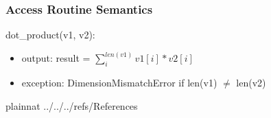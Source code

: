 \documentclass[12pt, titlepage]{article}
\begin{document}
\subsubsection{Access Routine Semantics}

\noindent dot\_product(v1, v2):
\begin{itemize}
\item output: result = $\sum_i^{len(v1)} v1[i] * v2[i]$
\item exception: DimensionMismatchError if len(v1) $\neq$ len(v2)
\end{itemize}


\newpage

 {plainnat}
 {../../../refs/References}

\newpage

\newpage{}
\end{document}
